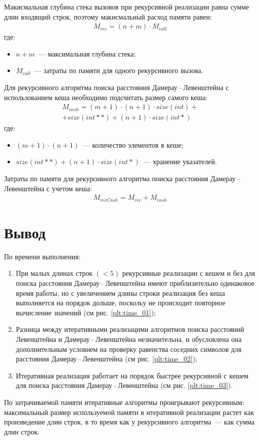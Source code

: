 Макисмальная глубина стека вызовов при рекурсивной реализации равна сумме длин входящий строк, поэтому макисмальный расход памяти равен:
\begin{equation}
	\label{}
	\begin{aligned}
		M_{rec} = (n + m) \cdot M_{call}
	\end{aligned}
\end{equation}
где: 
\begin{itemize}
    \item $n + m$~--- максимальная глубина стека;
	\item $M_{call}$~--- затраты по памяти для одного рекурсивного вызова.
\end{itemize}

Для рекурсивного алгоритма поиска расстояния Дамерау\,--\,Левенштейна с использованием кеша необходимо подсчитать размер самого кеша:
\begin{multline}
	M_{cash} = (m + 1) \cdot (n + 1) \cdot size(int) + \\ + size(int **) + (n + 1) \cdot size(int *)
\end{multline}
где: 
\begin{itemize}
    \item $(m + 1) \cdot (n + 1)$~--- количество элементов в кеше;
	\item $size(int **) + (n + 1) \cdot size(int *)$~--- хранение указателей.
\end{itemize}

Затраты по памяти для рекурсивного алгоритма поиска расстояния Дамерау\,--\,Левенштейна с учетом кеша: 
\begin{equation}
	\label{}
	\begin{aligned}
		M_{recCash} = M_{rec} + M_{cash}
	\end{aligned}
\end{equation}

\section{Вывод}

По времени выполнения:
\begin{enumerate}
	\item При малых длинах строк $(< 5)$ рекурсивные реализации с кешем и без для поиска расстояния Дамерау\,--\,Левенштейна имеют приблизительно одинаковое время работы, 
	но с увеличением длины строки реализация без кеша выполняется на порядок дольше, поскольу не происходит повторное вычисление значений (см рис. \ref{plt:time_01});
	\item Разница между итеративными реализацими алгоритмов поиска расстояний Левенштейна и Дамерау\,--\,Левенштейна незначительна, и обусловлена она
	дополнительным условием на проверку равенства соседних символов для расстояния Дамерау\,--\,Левенштейна (см рис. \ref{plt:time_02});
	\item Итеративная реализация работает на порядок быстрее рекурсивной с кешем для поиска расстояния Дамерау\,--\,Левенштейна (см рис. \ref{plt:time_03}).
\end{enumerate}

По затрачиваемой памяти итеративные алгоритмы проигрывают рекурсивным: максимальный размер используемой памяти в итеративной реализации растет
как произведение длин строк, в то время как у рекурсивного алгоритма~--- как сумма длин строк.